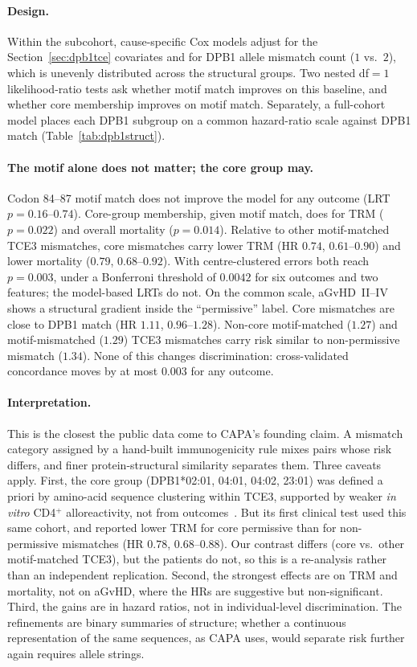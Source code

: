 \documentclass[11pt,a4paper]{article}
\begin{document}
\paragraph{Design.}
Within the subcohort, cause-specific Cox models adjust for the
Section~\ref{sec:dpb1tce} covariates and for DPB1 allele mismatch count
($1$ vs.\ $2$), which is unevenly distributed across the structural groups.
Two nested df${}=1$ likelihood-ratio tests ask whether motif match improves
on this baseline, and whether core membership improves on motif match.
Separately, a full-cohort model places each DPB1 subgroup on a common
hazard-ratio scale against DPB1 match (Table~\ref{tab:dpb1struct}).

\paragraph{The motif alone does not matter; the core group may.}
Codon 84--87 motif match does not improve the model for any outcome
(LRT $p=0.16$--$0.74$).  Core-group membership, given motif match, does for
TRM ($p=0.022$) and overall mortality ($p=0.014$).  Relative to other
motif-matched TCE3 mismatches, core mismatches carry lower TRM (HR $0.74$,
$0.61$--$0.90$) and lower mortality ($0.79$, $0.68$--$0.92$).  With
centre-clustered errors both reach $p=0.003$, under a Bonferroni threshold of
$0.0042$ for six outcomes and two features; the model-based LRTs do not.  On
the common scale, aGvHD~II--IV shows a structural gradient inside the
``permissive'' label.  Core mismatches are close to DPB1 match (HR $1.11$,
$0.96$--$1.28$).  Non-core motif-matched ($1.27$) and motif-mismatched
($1.29$) TCE3 mismatches carry risk similar to non-permissive mismatch
($1.34$).  None of this changes discrimination: cross-validated concordance
moves by at most $0.003$ for any outcome.

\paragraph{Interpretation.}
This is the closest the public data come to CAPA's founding claim.  A
mismatch category assigned by a hand-built immunogenicity rule mixes pairs
whose risk differs, and finer protein-structural similarity separates them.
Three caveats apply.  First, the core group
(DPB1*02:01, 04:01, 04:02, 23:01) was defined a priori by amino-acid
sequence clustering within TCE3, supported by weaker \emph{in vitro} CD4$^+$
alloreactivity, not from outcomes~\citep{arrietabolanos2022core}.  But its
first clinical test used this same cohort, and reported lower TRM for core
permissive than for non-permissive mismatches (HR $0.78$, $0.68$--$0.88$).
Our contrast differs (core vs.\ other motif-matched TCE3), but the patients
do not, so this is a re-analysis rather than an independent replication.
Second, the strongest effects are on TRM and mortality, not on aGvHD, where
the HRs are suggestive but non-significant.  Third, the gains are in hazard
ratios, not in individual-level discrimination.  The refinements are binary
summaries of structure; whether a continuous representation of the same
sequences, as CAPA uses, would separate risk further again requires allele
strings.
\end{document}
